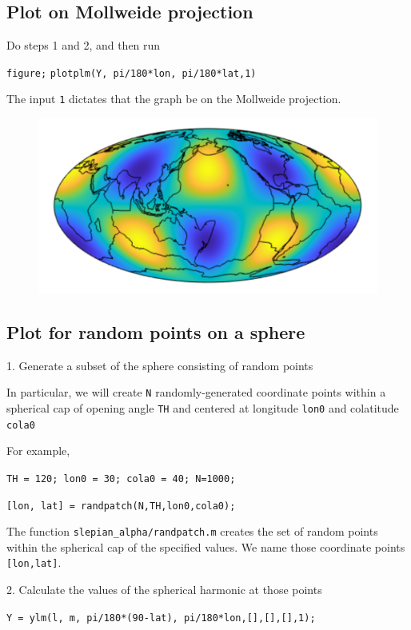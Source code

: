 \documentclass{article}
\begin{document}
\subsection{Plot on Mollweide projection}

Do steps 1 and 2, and then run

\verb+figure;+
\verb+plotplm(Y, pi/180*lon, pi/180*lat,1)+

The input \verb+1+ dictates that the graph be on the Mollweide projection.

\begin{figure}[H]
\includegraphics[scale=.75]{mollweide}
\end{figure}

\subsection{Plot for random points on a sphere}

1. Generate a subset of the sphere consisting of random points 

In particular, we will create \verb+N+ randomly-generated coordinate points within a spherical cap of opening angle \verb+TH+ and centered at longitude \verb+lon0+ and colatitude \verb+cola0+

For example, 

\verb+TH = 120; lon0 = 30; cola0 = 40; N=1000;+

\verb+[lon, lat] = randpatch(N,TH,lon0,cola0);+

The function \verb+slepian_alpha/randpatch.m+ creates the set of random points within the spherical cap of the specified values. We name those coordinate points \verb+[lon,lat]+.

2. Calculate the values of the spherical harmonic at those points

\verb+Y = ylm(l, m, pi/180*(90-lat), pi/180*lon,[],[],[],1);+
\end{document}
